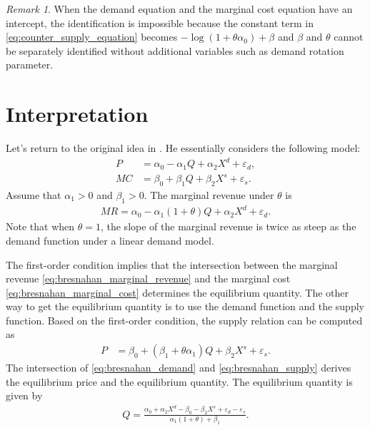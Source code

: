 \documentclass[11pt, a4paper]{article}
\theoremstyle{remark}
\newtheorem{remark}{Remark}
\begin{document}
\begin{remark}
    When the demand equation and the marginal cost equation have an intercept, the identification is impossible because the constant term in \eqref{eq:counter_supply_equation} becomes $-\log(1+\theta \alpha_0) + \beta$ and $\beta$ and $\theta$ cannot be separately identified without additional variables such as demand rotation parameter.
\end{remark}



\section{Interpretation}


Let's return to the original idea in \citet{bresnahan1982oligopoly}.
He essentially considers the following model:
\begin{align}
    P & = \alpha_0 - \alpha_1 Q + \alpha_2 X^d + \varepsilon_d,\label{eq:bresnahan_demand} \\
    MC & = \beta_0 + \beta_1 Q + \beta_2 X^s + \varepsilon_s. \label{eq:bresnahan_marginal_cost}
\end{align}
Assume that $\alpha_1>0$ and $\beta_1 >0$.
The marginal revenue under $\theta$ is
\begin{align}
    MR = \alpha_0 - \alpha_1(1 + \theta) Q + \alpha_2 X^d + \varepsilon_d. \label{eq:bresnahan_marginal_revenue}
\end{align}
Note that when $\theta = 1$, the slope of the marginal revenue is twice as steep as the demand function under a linear demand model.

The first-order condition implies that the intersection between the marginal revenue \eqref{eq:bresnahan_marginal_revenue} and the marginal cost \eqref{eq:bresnahan_marginal_cost} determines the equilibrium quantity.
The other way to get the equilibrium quantity is to use the demand function and the supply function.
Based on the first-order condition, the supply relation can be computed as
\begin{align}
    P & = \beta_0 + (\beta_1 + \theta\alpha_1) Q  + \beta_2 X^s + \varepsilon_s.\label{eq:bresnahan_supply}
\end{align}
The intersection of \eqref{eq:bresnahan_demand} and \eqref{eq:bresnahan_supply} derives the equilibrium price and the equilibrium quantity.
The equilibrium quantity is given by
\begin{align}
    Q = \frac{\alpha_0 + \alpha_2 X^d - \beta_0 - \beta_2 X^s + \varepsilon_d - \varepsilon_s}{\alpha_1(1 + \theta) +  \beta_1}.
\end{align}
\end{document}
